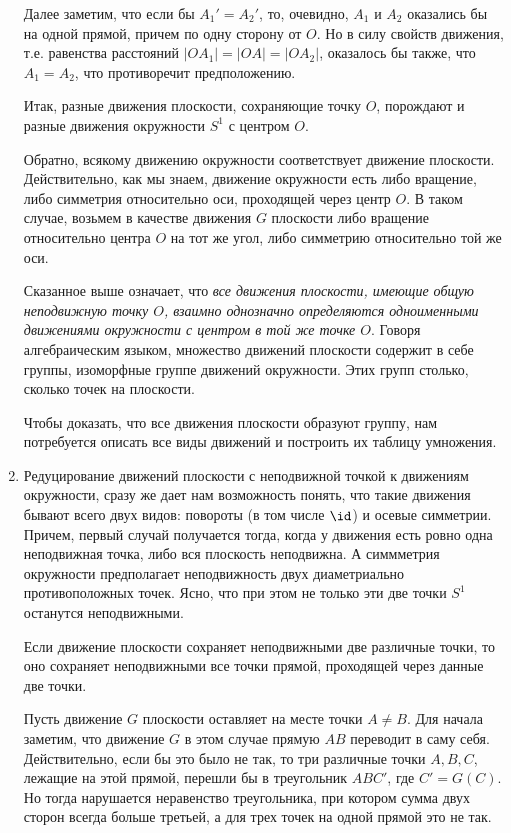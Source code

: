 \begin{enumerate}
Далее заметим, что если бы $A_1'=A_2'$, то, очевидно, $A_1$ и $A_2$ оказались бы на одной прямой, причем по одну сторону от $O$. Но в силу свойств движения, т.е. равенства расстояний $|OA_1|=|OA|=|OA_2|$, оказалось бы также, что $A_1=A_2$, что противоречит предположению.

Итак, разные движения плоскости, сохраняющие точку $O$, порождают и разные движения окружности $S^1$ с центром $O$.

Обратно, всякому движению окружности соответствует движение плоскости. Действительно, как мы знаем, движение окружности есть либо вращение, либо симметрия относительно оси, проходящей через центр $O$. В таком случае, возьмем в качестве движения $G$ плоскости либо вращение относительно центра $O$ на тот же угол, либо симметрию относительно той же оси.

Сказанное выше означает, что \textit{все движения плоскости, имеющие общую неподвижную точку $O$, взаимно однозначно определяются одноименными движениями окружности с центром в той же точке $O$}. Говоря алгебраическим языком, множество движений плоскости содержит в себе группы, изоморфные группе движений окружности. Этих групп столько, сколько точек на плоскости.

Чтобы доказать, что все движения плоскости образуют группу, нам потребуется описать все виды движений и построить их таблицу умножения.

\item Редуцирование движений плоскости с неподвижной точкой к движениям окружности, сразу же дает нам возможность понять, что такие движения бывают всего двух видов: повороты (в том числе $\id$) и осевые симметрии. Причем, первый случай получается тогда, когда у движения есть ровно одна неподвижная точка, либо вся плоскость неподвижна. А симмметрия окружности предполагает неподвижность двух диаметриально противоположных точек. Ясно, что при этом не только эти две точки $S^1$ останутся неподвижными.
\begin{lem} Если движение плоскости сохраняет неподвижными две различные точки, то оно сохраняет неподвижными все точки прямой, проходящей через данные две точки.
\end{lem}
\pf Пусть движение $G$ плоскости оставляет на месте точки $A\ne B$. Для начала заметим, что движение $G$ в этом случае прямую $AB$ переводит в саму себя. Действительно, если бы это было не так, то три различные точки $A,B,C$, лежащие на этой прямой, перешли бы в треугольник $ABC'$, где $C'=G(C)$. Но тогда нарушается неравенство треугольника, при котором сумма двух сторон всегда больше третьей, а для трех точек на одной прямой это не так.


\end{enumerate}
